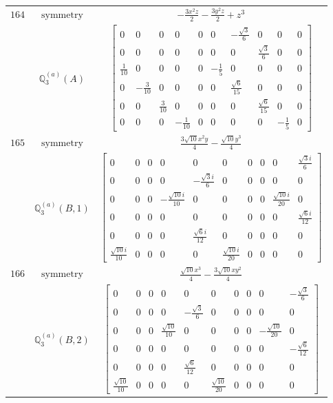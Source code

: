\documentclass[fleqn,8pt,landscape]{jsarticle}
\begin{document}
\begin{longtable}{ccc}
$ 164 $ & $ \text{symmetry} $ & $ - \frac{3 x^{2} z}{2} - \frac{3 y^{2} z}{2} + z^{3} $ \\
$  $ & $ \mathbb{Q}_{3}^{(a)}(A) $ & $ \begin{bmatrix} 0 & 0 & 0 & 0 & 0 & 0 & - \frac{\sqrt{3}}{6} & 0 & 0 & 0 \\ 0 & 0 & 0 & 0 & 0 & 0 & 0 & \frac{\sqrt{3}}{6} & 0 & 0 \\ \frac{1}{10} & 0 & 0 & 0 & 0 & - \frac{1}{5} & 0 & 0 & 0 & 0 \\ 0 & - \frac{3}{10} & 0 & 0 & 0 & 0 & \frac{\sqrt{6}}{15} & 0 & 0 & 0 \\ 0 & 0 & \frac{3}{10} & 0 & 0 & 0 & 0 & \frac{\sqrt{6}}{15} & 0 & 0 \\ 0 & 0 & 0 & - \frac{1}{10} & 0 & 0 & 0 & 0 & - \frac{1}{5} & 0 \end{bmatrix} $ \\ \hline
$ 165 $ & $ \text{symmetry} $ & $ \frac{3 \sqrt{10} x^{2} y}{4} - \frac{\sqrt{10} y^{3}}{4} $ \\
$  $ & $ \mathbb{Q}_{3}^{(a)}(B,1) $ & $ \begin{bmatrix} 0 & 0 & 0 & 0 & 0 & 0 & 0 & 0 & 0 & \frac{\sqrt{3} i}{6} \\ 0 & 0 & 0 & 0 & - \frac{\sqrt{3} i}{6} & 0 & 0 & 0 & 0 & 0 \\ 0 & 0 & 0 & - \frac{\sqrt{10} i}{10} & 0 & 0 & 0 & 0 & \frac{\sqrt{10} i}{20} & 0 \\ 0 & 0 & 0 & 0 & 0 & 0 & 0 & 0 & 0 & \frac{\sqrt{6} i}{12} \\ 0 & 0 & 0 & 0 & \frac{\sqrt{6} i}{12} & 0 & 0 & 0 & 0 & 0 \\ \frac{\sqrt{10} i}{10} & 0 & 0 & 0 & 0 & \frac{\sqrt{10} i}{20} & 0 & 0 & 0 & 0 \end{bmatrix} $ \\ \hline
$ 166 $ & $ \text{symmetry} $ & $ \frac{\sqrt{10} x^{3}}{4} - \frac{3 \sqrt{10} x y^{2}}{4} $ \\
$  $ & $ \mathbb{Q}_{3}^{(a)}(B,2) $ & $ \begin{bmatrix} 0 & 0 & 0 & 0 & 0 & 0 & 0 & 0 & 0 & - \frac{\sqrt{3}}{6} \\ 0 & 0 & 0 & 0 & - \frac{\sqrt{3}}{6} & 0 & 0 & 0 & 0 & 0 \\ 0 & 0 & 0 & \frac{\sqrt{10}}{10} & 0 & 0 & 0 & 0 & - \frac{\sqrt{10}}{20} & 0 \\ 0 & 0 & 0 & 0 & 0 & 0 & 0 & 0 & 0 & - \frac{\sqrt{6}}{12} \\ 0 & 0 & 0 & 0 & \frac{\sqrt{6}}{12} & 0 & 0 & 0 & 0 & 0 \\ \frac{\sqrt{10}}{10} & 0 & 0 & 0 & 0 & \frac{\sqrt{10}}{20} & 0 & 0 & 0 & 0 \end{bmatrix} $ \\ \hline

\end{longtable}
\end{document}
